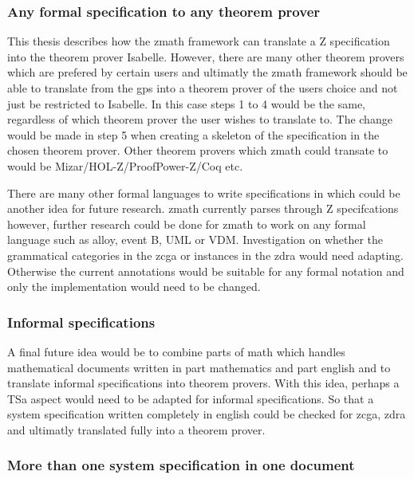 \subsubsection{Any formal specification to any theorem prover}
\label{subsubsec:anyformanythe}

This thesis describes how the \gls{zmath} framework can translate a Z specification into the theorem prover Isabelle. However, there are many other theorem provers which are prefered by certain users and ultimatly the \gls{zmath} framework should be able to translate from the \gls{gps} into a theorem prover of the users choice and not just be restricted to Isabelle. In this case steps 1 to 4 would be the same, regardless of which theorem prover the user wishes to translate to. The change would be made in step 5 when creating a skeleton of the specification in the chosen theorem prover. Other theorem provers which \gls{zmath} could transate to would be Mizar/HOL-Z/ProofPower-Z/Coq etc.

There are many other formal languages to write specifications in which could be another idea for future research. \Gls{zmath} currently parses through Z specifcations however, further research could be done for \gls{zmath} to work on any formal language such as alloy, event B, UML or VDM. Investigation on whether the grammatical categories in the \gls{zcga} or instances in the \gls{zdra} would need adapting. Otherwise the current annotations would be suitable for any formal notation and only the implementation would need to be changed.

\subsubsection{Informal specifications}
\label{subsubsec:informalspecs}

A final future idea would be to combine parts of \gls{math} which handles mathematical documents written in part mathematics and part english and to translate informal specifications into theorem provers. With this idea, perhaps a TSa aspect would need to be adapted for informal specifications. So that a system specification written completely in english could be checked for \gls{zcga}, \gls{zdra} and ultimatly translated fully into a theorem prover.

\subsubsection{More than one system specification in one document}

